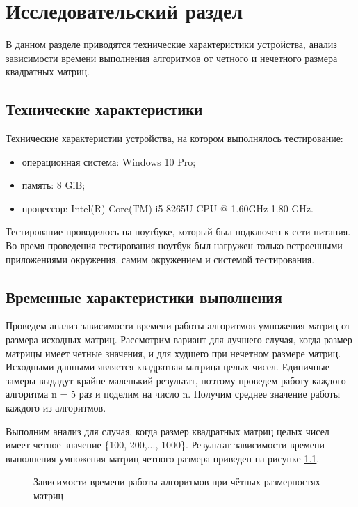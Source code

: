 \chapter{Исследовательский раздел}
В данном разделе приводятся технические характеристики устройства, анализ зависимости времени выполнения алгоритмов от четного и нечетного размера квадратных матриц.
\section{Технические характеристики}
Технические характеристии устройства, на котором выполнялось тестирование:
\begin{itemize}
	\item операционная система: Windows 10 Pro;
	\item память: 8 GiB;
	\item процессор: Intel(R) Core(TM) i5-8265U CPU @ 1.60GHz   1.80 GHz.
\end{itemize}
Тестирование проводилось на ноутбуке, который был подключен к сети питания. Во время проведения тестирования ноутбук был нагружен только встроенными приложениями окружения, самим окружением и системой тестирования.

\section{Временные характеристики выполнения}
Проведем анализ зависимости времени работы алгоритмов умножения матриц от размера исходных матриц. Рассмотрим вариант для лучшего случая, когда размер матрицы имеет четные значения, и для худшего при нечетном размере матриц. Исходными данными является квадратная матрица целых чисел. Единичные замеры выдадут крайне маленький результат, поэтому проведем работу каждого алгоритма n = 5 раз и поделим на число n. Получим среднее значение работы каждого из алгоритмов. 

Выполним анализ для случая, когда размер квадратных матриц целых чисел имеет четное значение \{100, 200,..., 1000\}. Результат зависимости времени выполнения умножения матриц четного размера приведен на рисунке \ref{fg:6_1}.

\begin{figure}[H]
	\centering
	\caption{Зависимости времени работы алгоритмов при чётных размерностях матриц} 
	\label{fg:6_1}
\end{figure}

